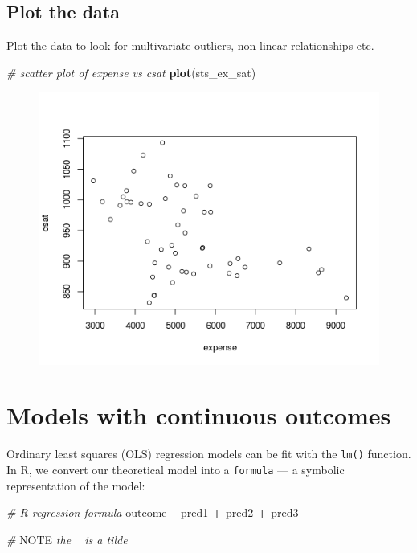 \documentclass[]{book}
\newenvironment{Shaded}{\begin{snugshade}}{\end{snugshade}}
\newcommand{\KeywordTok}[1]{\textcolor[rgb]{0.13,0.29,0.53}{\textbf{#1}}}
\newcommand{\StringTok}[1]{\textcolor[rgb]{0.31,0.60,0.02}{#1}}
\newcommand{\CommentTok}[1]{\textcolor[rgb]{0.56,0.35,0.01}{\textit{#1}}}
\newcommand{\OperatorTok}[1]{\textcolor[rgb]{0.81,0.36,0.00}{\textbf{#1}}}
\newcommand{\AlertTok}[1]{\textcolor[rgb]{0.94,0.16,0.16}{#1}}
\newcommand{\NormalTok}[1]{#1}
\begin{document}
\subsection{Plot the data}\label{plot-the-data}

Plot the data to look for multivariate outliers, non-linear
relationships etc.

\begin{Shaded}
\begin{Highlighting}[]
  \CommentTok{# scatter plot of expense vs csat}
  \KeywordTok{plot}\NormalTok{(sts_ex_sat)}
\end{Highlighting}
\end{Shaded}

\begin{figure}
\centering
\includegraphics{R/Rmodels/images/statesCorr1.png}
\caption{}
\end{figure}

\section{Models with continuous
outcomes}\label{models-with-continuous-outcomes}

Ordinary least squares (OLS) regression models can be fit with the
\texttt{lm()} function. In R, we convert our theoretical model into a
\texttt{formula} --- a symbolic representation of the model:

\begin{Shaded}
\begin{Highlighting}[]
\CommentTok{# R regression formula}
\NormalTok{outcome }\OperatorTok{~}\StringTok{ }\NormalTok{pred1 }\OperatorTok{+}\StringTok{ }\NormalTok{pred2 }\OperatorTok{+}\StringTok{ }\NormalTok{pred3}

\CommentTok{# }\AlertTok{NOTE}\CommentTok{ the ~ is a tilde}
\end{Highlighting}
\end{Shaded}
\end{document}

